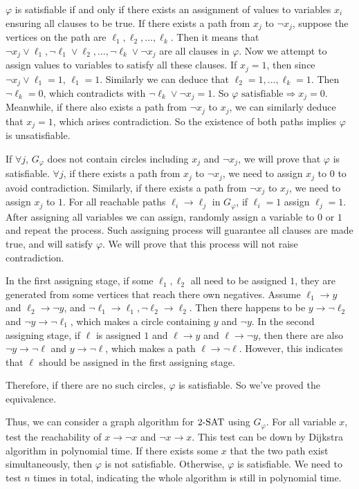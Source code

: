 \documentclass{homework}
\begin{document}
\begin{solution}
  $\varphi$ is satisfiable if and only if there exists an assignment of values to variables $x_i$ ensuring all clauses to be true. If there exists a path from  $x_j$ to $\neg x_j$, suppose the vertices on the path are $\ell_1,\ell_2,...,\ell_k$. Then it means that $\neg x_j\lor \ell_1,\neg\ell_1\lor\ell_2,...,\neg\ell_k\lor \neg x_j$ are all clauses in $\varphi$. Now we attempt to assign values to variables to satisfy all these clauses. If $x_j=1$, then since $\neg x_j\lor \ell_1=1$, $\ell_1= 1$. Similarly we can deduce that $\ell_2=1,...,\ell_k=1$. Then $\neg\ell_k=0$, which contradicts with $\neg\ell_k\lor \neg x_j=1$. So $\varphi \text{ satisfiable}\Rightarrow x_j=0$. Meanwhile, if there also exists a path from $\neg x_j$ to $x_j$, we can similarly deduce that $x_j=1$, which arises contradiction. So the existence of both paths implies $\varphi$ is unsatisfiable. 
  
  If $\forall j$, $G_\varphi$ does not contain circles including $x_j$ and $\neg x_j$, we will prove that $\varphi$ is satisfiable. $\forall j$, if there exists a path from $x_j$ to $\neg x_j$, we need to assign $x_j$ to $0$ to avoid contradiction. Similarly, if there exists a path from $\neg x_j$ to $x_j$, we need to assign $x_j$ to $1$. For all reachable paths $\ell_i \to\ell_j$ in $G_\varphi$, if $\ell_i=1$ assign $\ell_j=1$. After assigning all variables we can assign, randomly assign a variable to $0$ or $1$ and repeat the process. Such assigning process will guarantee all clauses are made true, and will satisfy $\varphi$. We will prove that this process will not raise contradiction. 
  
  In the first assigning stage, if some $\ell_1,\ell_2$ all need to be assigned $1$, they are generated from some vertices that reach there own negatives. Assume $\ell_1\to y$ and $\ell_2\to \neg y$, and $\neg\ell_1\to\ell_1,\neg\ell_2\to\ell_2$. Then there happens to be $y\to\neg\ell_2$ and $\neg y\to\neg\ell_1$, which makes a circle containing $y$ and $\neg y$. In the second assigning stage, if $\ell$ is assigned $1$ and $\ell\to y$ and $\ell\to \neg y$, then there are also $\neg y \to\neg\ell$ and $y\to\neg\ell$, which makes a path $\ell\to\neg\ell$. However, this indicates that $\ell$ should be assigned in the first assigning stage.

  Therefore, if there are no such circles, $\varphi$ is satisfiable. So we've proved the equivalence.

  Thus, we can consider a graph algorithm for $2\text{-}\mathrm{SAT}$ using $G_\varphi$. For all variable $x$, test the reachability of $x\to\neg x$ and $\neg x \to x$. This test can be down by Dijkstra algorithm in polynomial time. If there exists some $x$ that the two path exist simultaneously, then $\varphi$ is not satisfiable. Otherwise, $\varphi$ is satisfiable. We need to test $n$ times in total, indicating the whole algorithm is still in polynomial time.

\end{solution}
\end{document}

